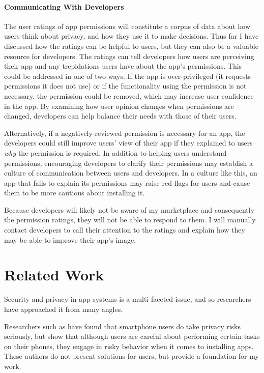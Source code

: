 \documentclass[11pt]{article}
\begin{document}
\paragraph{Communicating With Developers}
\label{subsubsec-dev-comm}

The user ratings of app permissions will constitute a corpus of 
data about how users think about privacy, and how they use it to make decisions.
Thus far I have discussed how the ratings can be helpful to users, but
they can also be a valuable resource for developers. The ratings can tell
developers how users are perceiving their app and any trepidations users
have about the app's permissions. This could be addressed in one of two 
ways. If the app is over-privileged (it requests permissions it does not
use) or if the functionality using the permission is not necessary, the
permission could be removed, which may increase user confidence in the 
app. By examining how user opinion changes when permissions are changed,
developers can help balance their needs with those of their users. 

Alternatively, if a negatively-reviewed permission is necessary for
an app, the developers could still improve users' view of their app
if they explained to users \emph{why} the permission is required. In 
addition to helping users understand permissions, encouraging developers 
to clarify their permissions may establish a culture of communication
between users and developers. In a culture like this, an app that fails
to explain its permissions may raise red flags for users and cause them 
to be more cautious about 
installing it. 

Because developers will likely not be aware of my marketplace and 
consequently the permission ratings, they will not be able to respond 
to them. I will manually contact developers to call their attention
to the ratings and explain how they may be able to improve their 
app's image.


\section{Related Work}

Security and privacy in app systems is a multi-faceted issue, and 
so researchers have approached it from many angles.

Researchers such as \citet{99-problems-SPSM12} have found 
that smartphone users do take privacy risks seriously, but
\citet{smartphone-user-conf-SOUPS12} show that although
users are careful about
performing certain tasks on their phones, they engage in risky behavior
when it comes to installing apps. These
authors do not present solutions for users, but 
provide a foundation for my work.
\end{document}
